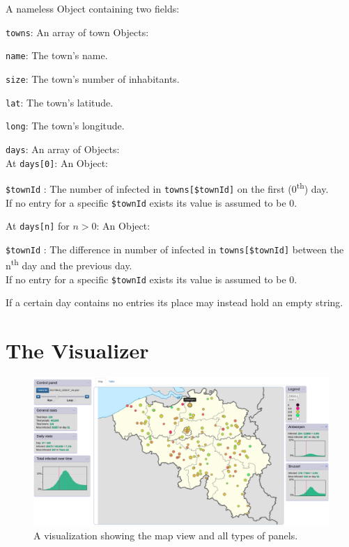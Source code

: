 A nameless Object containing two fields:
\begin{compactitem}	
	\item \texttt{towns}: An array of town Objects:
	\begin{compactitem}	
		\item \texttt{name}: The town's name.
		\item \texttt{size}: The town's number of inhabitants.
		\item \texttt{lat}: The town's latitude.
		\item \texttt{long}: The town's longitude.
	\end{compactitem}
	\pagebreak
	\item \texttt{days}: An array of Objects:\\
	At \texttt{days[0]}: An Object:
	\begin{compactitem}				
		\item \texttt{\$townId} : The number of infected in \texttt{towns[\$townId]} on the first (0\textsuperscript{th}) day.\\
		If no entry for a specific \texttt{\$townId} exists its value is assumed to be 0.
	\end{compactitem}
	At \texttt{days[n]} for $n > 0$: An Object:
	\begin{compactitem}				
		\item \texttt{\$townId} : The difference in number of infected in \texttt{towns[\$townId]} between the n\textsuperscript{th} day and the previous day.\\
		If no entry for a specific \texttt{\$townId} exists its value is assumed to be 0.
	\end{compactitem}
	
	\vspace{4pt}	
	If a certain day contains no entries its place may instead hold an empty string.
\end{compactitem}
	
	

\section{The Visualizer}

\begin{figure}[!b]
	\centering
	\includegraphics[width=\textwidth]{images/visualizer.png}
	\caption{A visualization showing the map view and all types of panels.}
\end{figure}

